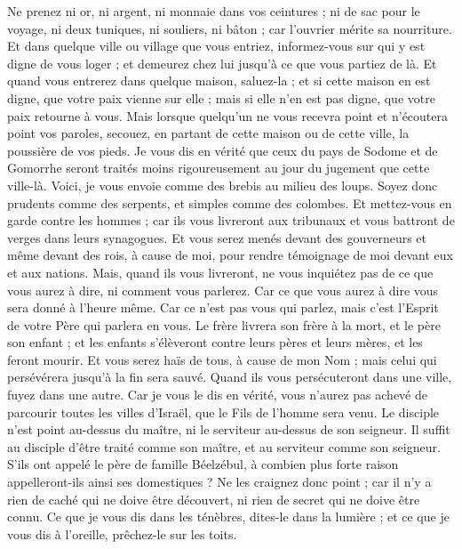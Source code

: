 \begin{multicols}{2}
Ne prenez ni or, ni argent, ni monnaie dans vos ceintures ;
ni de sac pour le voyage, ni deux tuniques, ni souliers, ni bâton ; car l'ouvrier mérite sa nourriture.
Et dans quelque ville ou village que vous entriez, informez-vous sur qui y est digne de vous loger ; et demeurez chez lui jusqu'à ce que vous partiez de là.
Et quand vous entrerez dans quelque maison, saluez-la ;
et si cette maison en est digne, que votre paix vienne sur elle ; mais si elle n'en est pas digne, que votre paix retourne à vous.
Mais lorsque quelqu'un ne vous recevra point et n'écoutera point vos paroles, secouez, en partant de cette maison ou de cette ville, la poussière de vos pieds.
Je vous dis en vérité que ceux du pays de Sodome et de Gomorrhe seront traités moins rigoureusement au jour du jugement que cette ville-là.
Voici, je vous envoie comme des brebis au milieu des loups. Soyez donc prudents comme des serpents, et simples comme des colombes.
Et mettez-vous en garde contre les hommes ; car ils vous livreront aux tribunaux et vous battront de verges dans leurs synagogues.
Et vous serez menés devant des gouverneurs et même devant des rois, à cause de moi, pour rendre témoignage de moi devant eux et aux nations.
Mais, quand ils vous livreront, ne vous inquiétez pas de ce que vous aurez à dire, ni comment vous parlerez. Car ce que vous aurez à dire vous sera donné à l'heure même.
Car ce n'est pas vous qui parlez, mais c'est l'Esprit de votre Père qui parlera en vous.
Le frère livrera son frère à la mort, et le père son enfant ; et les enfants s'élèveront contre leurs pères et leurs mères, et les feront mourir.
Et vous serez haïs de tous, à cause de mon Nom ; mais celui qui persévérera jusqu'à la fin sera sauvé.
Quand ils vous persécuteront dans une ville, fuyez dans une autre. Car je vous le dis en vérité, vous n'aurez pas achevé de parcourir toutes les villes d'Israël, que le Fils de l'homme sera venu.
Le disciple n'est point au-dessus du maître, ni le serviteur au-dessus de son seigneur.
Il suffit au disciple d'être traité comme son maître, et au serviteur comme son seigneur. S'ils ont appelé le père de famille Béelzébul, à combien plus forte raison appelleront-ils ainsi ses domestiques ?
Ne les craignez donc point ; car il n'y a rien de caché qui ne doive être découvert, ni rien de secret qui ne doive être connu.
Ce que je vous dis dans les ténèbres, dites-le dans la lumière ; et ce que je vous dis à l'oreille, prêchez-le sur les toits.

\end{multicols}

